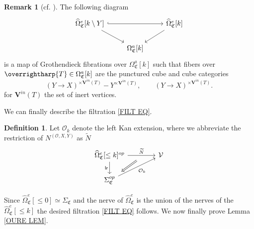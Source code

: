 \documentclass[a4paper,10pt
,draft
]{article}%
\numberwithin{equation}{section}
\numberwithin{figure}{section}
\theoremstyle{definition} %
\newtheorem{definition}[equation]{Definition}%
\newtheorem{remark}[equation]{Remark}%
\newcommand{\vect}[1]{\text{\overrightharp{\ensuremath{#1}}}}
\newcommand{\V}{\ensuremath{\mathcal V}}
\renewcommand{\O}{\ensuremath{\mathcal O}}
\newcommand{\1}{\ensuremath{\mathbbm 1}}%
\newcommand{\SC}{\Sigma_{\mathfrak C}}
\begin{document}
\begin{remark}[{cf. \cite[Remark 5.57]{BP_geo}}]
	\label{OEFIB REM}
	The following diagram
	\begin{equation}
	\begin{tikzcd}
	\widehat\Omega_{\mathfrak C}^e[k \setminus Y] \arrow[rr, hookrightarrow] \arrow[dr]
	&&
	\widehat\Omega_{\mathfrak C}^e[k] \arrow[dl]
	\\
	&
	\Omega_{\mathfrak C}^a[k]
	\end{tikzcd}
	\end{equation}
	is a map of Grothendieck fibrations over $\Omega_{\mathfrak C}^a[k]$
	such that fibers over $\vect{T} \in \Omega_{\mathfrak C}^a[k]$ are the punctured cube and cube categories
	\begin{equation}
	(Y \to X)^{\times \boldsymbol{V}^{in}(T)} - Y^{\times \boldsymbol{V}^{in}(T)},
	\qquad
	(Y \to X)^{\times \boldsymbol{V}^{in}(T)}.
	\end{equation}
	for $\boldsymbol{V}^{in}(T)$ the set of inert vertices.
\end{remark}



We can finally describe the filtration \eqref{FILT EQ}.
\begin{definition}\label{FILTSTAGE DEF}
	Let $\O_k$ denote the left Kan extension, 
	where we abbreviate the restriction of $N^{(\O,X,Y)}$ as $\widetilde{N}$
	\begin{equation}
	\begin{tikzcd}[column sep = 40pt]
	\widehat\Omega_{\mathfrak C}^e[\leq k]^{op}
	\ar{r}{\widetilde N}[swap,name = A]{} \arrow[d, "\mathsf{lr}"']
	&
	\V
	\\
	|[alias = B]|
	\SC^{op}
	\arrow[ur, "\O_k"']
	\arrow[Rightarrow, from = A, to = B, shorten <=0.2cm, shorten >=0.2cm]
	\end{tikzcd}
	\end{equation}
\end{definition}

Since $\widehat\Omega_{\mathfrak C}^e[\leq 0] \simeq \SC$
and the nerve of $\widehat \Omega_{\mathfrak C}^e$ is the union of the nerves of the $\widehat\Omega_{\mathfrak C}^e[\leq k]$
the desired filtration \eqref{FILT EQ} follows.
%
We now finally prove Lemma \ref{OURE LEM}.
\end{document}
